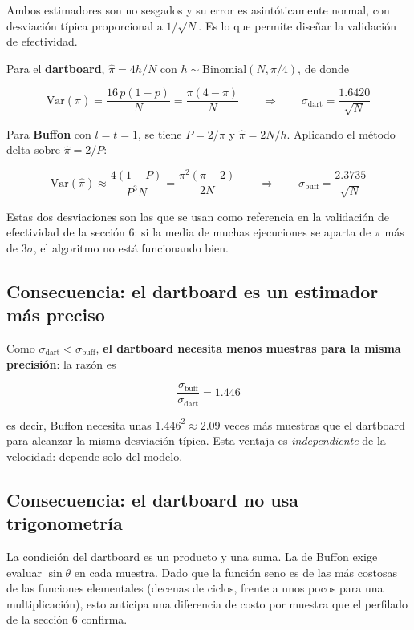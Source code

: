 Ambos estimadores son no sesgados y su error es asintóticamente normal, con desviación típica proporcional a $1/\sqrt{N}$. Es lo que permite diseñar la validación de efectividad.

Para el \textbf{dartboard}, $\hat\pi = 4h/N$ con $h \sim \text{Binomial}(N, \pi/4)$, de donde

\[
\text{Var}(\hat\pi) = \frac{16\,p(1-p)}{N} = \frac{\pi(4-\pi)}{N}
\qquad\Longrightarrow\qquad
\sigma_{\text{dart}} = \frac{1.6420}{\sqrt{N}}
\]

Para \textbf{Buffon} con $l = t = 1$, se tiene $P = 2/\pi$ y $\hat\pi = 2N/h$. Aplicando el método delta sobre $\hat\pi = 2/P$:

\[
\text{Var}(\hat\pi) \approx \frac{4(1-P)}{P^3 N} = \frac{\pi^2(\pi-2)}{2N}
\qquad\Longrightarrow\qquad
\sigma_{\text{buff}} = \frac{2.3735}{\sqrt{N}}
\]

Estas dos desviaciones son las que se usan como referencia en la validación de efectividad de la sección 6: si la media de muchas ejecuciones se aparta de $\pi$ más de $3\sigma$, el algoritmo no está funcionando bien.

\subsection{Consecuencia: el dartboard es un estimador más preciso}

Como $\sigma_{\text{dart}} < \sigma_{\text{buff}}$, \textbf{el dartboard necesita menos muestras para la misma precisión}: la razón es

\[
\frac{\sigma_{\text{buff}}}{\sigma_{\text{dart}}} = 1.446
\]

es decir, Buffon necesita unas $1.446^2 \approx 2.09$ veces más muestras que el dartboard para alcanzar la misma desviación típica. Esta ventaja es \emph{independiente} de la velocidad: depende solo del modelo.

\subsection{Consecuencia: el dartboard no usa trigonometría}

La condición del dartboard es un producto y una suma. La de Buffon exige evaluar $\sin\theta$ en cada muestra. Dado que la función seno es de las más costosas de las funciones elementales (decenas de ciclos, frente a unos pocos para una multiplicación), esto anticipa una diferencia de costo por muestra que el perfilado de la sección 6 confirma.
